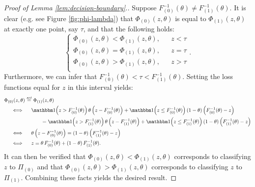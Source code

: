 \begin{proof}[Proof of Lemma \ref{lem:decision-boundary}.]
  Suppose $F_{(0)}^{-1}(\theta) \ne F_{(1)}^{-1}(\theta)$.  It is clear
  (e.g. see Figure \ref{fig:phi-lambda}) that $\Phi_{(0)}(z, \theta)$ is
  equal to $\Phi_{(1)}(z, \theta)$ at exactly one point, say $\tau$, and that
  the following holds:
  \begin{equation*}
    \left\{
      \begin{array}{lll}
        \Phi_{(0)}(z, \theta) < \Phi_{(1)}(z, \theta), & & z < \tau \\[1ex]
        \Phi_{(0)}(z, \theta) = \Phi_{(1)}(z, \theta), & & z = \tau \\[1ex]
        \Phi_{(0)}(z, \theta) > \Phi_{(1)}(z, \theta), & & z > \tau \\
      \end{array} .
    \right.
  \end{equation*}
  Furthermore, we can infer that
  $F_{(0)}^{-1}(\theta) < \tau < F_{(1)}^{-1}(\theta)$.  Setting the loss
  functions equal for $z$ in this interval yields:
  \begin{align*}
    & \Phi_{(0)}(z, \theta) \stackrel{\mathit{set}}{=} \Phi_{(1)}(z, \theta) \\
    & \hspace{5mm} \Longleftrightarrow \hspace{5mm}
      \ind\!\! \left(z > F_{(0)}^{-1}(\theta)\right) \theta
      \left(z - F_{(0)}^{-1}(\theta)\right) +
      \ind\!\! \left(z \leq F_{(0)}^{-1}(\theta)\right) (1 - \theta)
      \left(F_{(0)}^{-1}(\theta) - z\right) \\
    & \hspace{25mm} =
      \ind\!\! \left(z > F_{(1)}^{-1}(\theta)\right) \theta
      \left(z - F_{(1)}^{-1}(\theta)\right) +
      \ind\!\! \left(z \leq F_{(1)}^{-1}(\theta)\right) (1 - \theta)
      \left(F_{(1)}^{-1}(\theta) - z\right) \\
    & \hspace{5mm} \Longleftrightarrow \hspace{5mm}
      \theta \left(z - F_{(0)}^{-1}(\theta)\right) =
      (1 - \theta) \left(F_{(1)}^{-1}(\theta) - z\right) \\
    & \hspace{5mm} \Longleftrightarrow \hspace{5mm}
      z = \theta\, F_{(0)}^{-1}(\theta) + (1 - \theta)\, F_{(1)}^{-1}(\theta).
  \end{align*}
  It can then be verified that $\Phi_{(0)}(z, \theta) < \Phi_{(1)}(z, \theta)$
  corresponds to classifying $z$ to $\Pi_{(0)}$ and that
  $\Phi_{(0)}(z, \theta) > \Phi_{(1)}(z, \theta)$ corresponds to classifying $z$
  to $\Pi_{(1)}$.  Combining these facts yields the desired result.
\end{proof}

